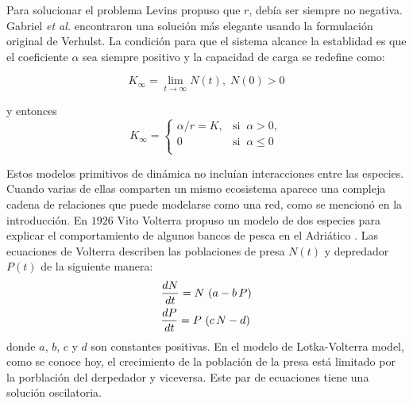 Para solucionar el problema Levins propuso que $r$, debía ser siempre no negativa. Gabriel \emph{et al.} encontraron una solución más elegante usando la formulación original de Verhulst. La condición para que el sistema alcance la establidad es que el coeficiente $\alpha$ sea siempre positivo y la capacidad de carga se redefine como:

\begin{equation}
K_{\infty}=\lim_{t\rightarrow\infty}N(t),\; N(0)>0
\end{equation}

\noindent y entonces
\begin{equation*}
K_{\infty}=\left\{
\begin{array}{ll}
  \alpha / r = K, & \mathrm{si} \;\; \alpha > 0, \\ 0  & \mathrm{si} \;\; \alpha \le0 \\
  \end{array} \right.
\end{equation*}

Estos modelos primitivos de dinámica no incluían interacciones entre las especies. Cuando varias de ellas comparten un mismo ecosistema aparece una compleja cadena de relaciones que puede modelarse como una red, como se mencionó en la introducción. En $1926$ Vito Volterra propuso un modelo de dos especies para explicar el comportamiento de algunos bancos de pesca en el Adriático \cite{volterra1926}. Las ecuaciones de Volterra describen las poblaciones de presa $N(t)$ y depredador $P(t)$ de la siguiente manera: 
\begin{align}
\displaystyle &\frac{dN}{dt}=N\, \left(a-b \,P\right) \nonumber\\
\displaystyle &\frac{dP}{dt}=P\, \left(c\, N-d\right) 
\label{myeq1}
\end{align}
\noindent donde $a$, $b$, $c$ y $d$ son constantes positivas. En el modelo de Lotka-Volterra model, como se conoce hoy, el crecimiento de la población de la presa está limitado por la porblación del derpedador y viceversa. Este par de ecuaciones tiene una solución oscilatoria.

